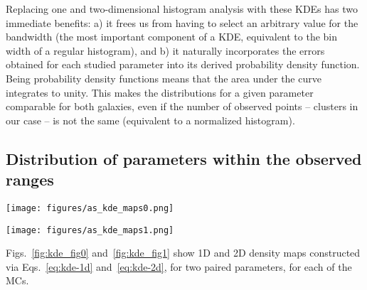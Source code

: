\documentclass[draft]{aa}
\begin{document}
Replacing one and two-dimensional histogram analysis with these KDEs has two
immediate benefits: a) it frees us from having to select an
arbitrary value for the bandwidth (the most important component of a KDE,
equivalent to the bin width of a regular histogram), and b) it naturally
incorporates the errors obtained for each studied parameter into its derived
probability density function.
%
Being probability density functions means that the area under the curve
integrates to unity. This makes the distributions for a given parameter
comparable for both galaxies, even if the number of observed points -- clusters
in our case -- is not the same (equivalent to a normalized histogram).



\subsection{Distribution of parameters within the observed ranges}
\label{ssec:dist_ranges}

\begin{figure*}
\texttt{[image: figures/as\_kde\_maps0.png]}
\caption{One and two-dimensional Gaussian adaptive KDEs for the age, metallicity
and mass parameters. Top and right plots are 1D KDEs while the center plots are
2D KDEs.
Observed clusters are plotted as red and blue stars for the S/LMC,
respectively in the 2D KDEs. Sizes are scaled according to each cluster's radius
in parsecs. A small scatter is introduced for clarity.}
\label{fig:kde_fig0}
\end{figure*}

\begin{figure*}
\texttt{[image: figures/as\_kde\_maps1.png]}
\caption{Same as Fig.~\ref{fig:kde_fig0} for the $E_{(B-V)}$ and distance
modulus parameters.}
\label{fig:kde_fig1}
\end{figure*}

Figs.~\ref{fig:kde_fig0} and~\ref{fig:kde_fig1} show 1D and 2D density maps
constructed via Eqs.~\ref{eq:kde-1d} and~\ref{eq:kde-2d}, for two paired
parameters, for each of the MCs.\@
\end{document}
